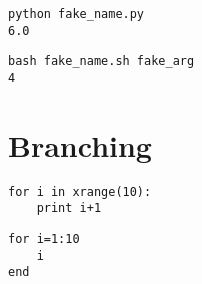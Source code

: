 \documentclass{article}
\begin{document}
\begin{Verbatim}[numbers=none,frame=lines,label=\fbox{{\tiny Terminal}},fontsize=\fontsize{9pt}{9pt},
labelposition=topline,framesep=2.5mm,framerule=0.7pt]
python fake_name.py
6.0
\end{Verbatim}
\noindent

\begin{Verbatim}[numbers=none,frame=lines,label=\fbox{{\tiny Terminal}},fontsize=\fontsize{9pt}{9pt},
labelposition=topline,framesep=2.5mm,framerule=0.7pt]
bash fake_name.sh fake_arg
4
\end{Verbatim}
\noindent

\section*{Branching}




\begin{Verbatim}
for i in xrange(10):
    print i+1
\end{Verbatim}

\bad

\begin{Verbatim}
for i=1:10
    i
end
\end{Verbatim}





\end{document}
